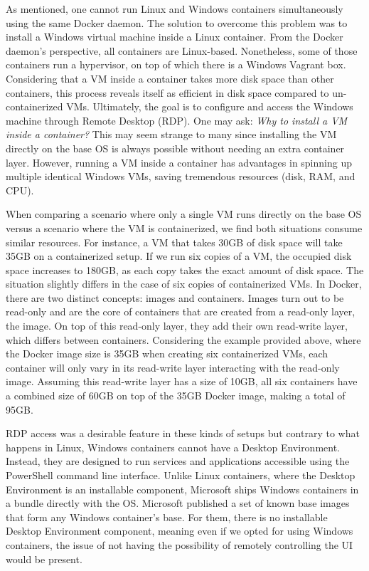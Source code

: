 As mentioned, one cannot run Linux and Windows containers simultaneously using the same Docker daemon. The solution to overcome this problem was to install a Windows virtual machine inside a Linux container. From the Docker daemon's perspective, all containers are Linux-based. Nonetheless, some of those containers run a hypervisor, on top of which there is a Windows Vagrant box. Considering that a VM inside a container takes more disk space than other containers, this process reveals itself as efficient in disk space compared to un-containerized VMs. Ultimately, the goal is to configure and access the Windows machine through Remote Desktop (RDP). One may ask: \textit{Why to install a VM inside a container?} This may seem strange to many since installing the VM directly on the base OS is always possible without needing an extra container layer. However, running a VM inside a container has advantages in spinning up multiple identical Windows VMs, saving tremendous resources (disk, RAM, and CPU).

When comparing a scenario where only a single VM runs directly on the base OS versus a scenario where the VM is containerized, we find both situations consume similar resources. For instance, a VM that takes 30GB of disk space will take 35GB on a containerized setup. If we run six copies of a VM, the occupied disk space increases to 180GB, as each copy takes the exact amount of disk space. The situation slightly differs in the case of six copies of containerized VMs. In Docker, there are two distinct concepts: images and containers. Images turn out to be read-only and are the core of containers that are created from a read-only layer, the image. On top of this read-only layer, they add their own read-write layer, which differs between containers. Considering the example provided above, where the Docker image size is 35GB when creating six containerized VMs, each container will only vary in its read-write layer interacting with the read-only image. Assuming this read-write layer has a size of 10GB, all six containers have a combined size of 60GB on top of the 35GB Docker image, making a total of 95GB.

RDP access was a desirable feature in these kinds of setups but contrary to what happens in Linux,  Windows containers cannot have a Desktop Environment. Instead, they are designed to run services and applications accessible using the PowerShell command line interface. Unlike Linux containers, where the Desktop Environment is an installable component, Microsoft ships Windows containers in a bundle directly with the OS. Microsoft published a set of known base images that form any Windows container's base. For them, there is no installable Desktop Environment component, meaning even if we opted for using Windows containers, the issue of not having the possibility of remotely controlling the UI would be present.

